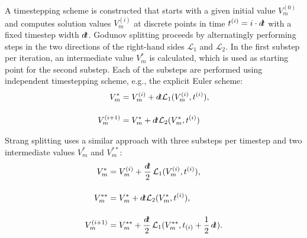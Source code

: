 A timestepping scheme is constructed that starts with a given initial value $V_m^{(0)}$ and computes solution values $V_m^{(i)}$ at discrete points in time $t^{(i)} = i\cdot\dt$ with a fixed timestep width $\dt$.
Godunov splitting proceeds by alternatingly performing steps in the two directions of the right-hand sides $\mathcal{L}_1$ and $\mathcal{L}_2$. In the first substep per iteration, an intermediate value $V_m^{\ast}$ is calculated, which is used as starting point for the second substep. Each of the substeps are performed using independent timestepping scheme, e.g., the explicit Euler scheme:
%
\begin{subequations}\label{eq:monodomain_godunov}
  \begin{align}
    V_m^{\ast} &= V_m^{(i)} + \dt \mathcal{L}_1(V_m^{(i)},t^{(i)}),\\[4mm]
    V_m^{(i+1)} &= V_m^{\ast} + \dt \mathcal{L}_2(V_m^{\ast},t^{(i)})
  \end{align}
\end{subequations}

Strang splitting uses a similar approach with three substeps per timestep and two intermediate values $V_m^{\ast}$ and $V_m^{\ast\ast}$:
%
\begin{subequations}\label{eq:monodomain_strang}
  \begin{align}
    V_m^{\ast} &= V_m^{(i)} + \dfrac{\dt}{2} \mathcal{L}_1(V_m^{(i)},t^{(i)}),\\[4mm]
    V_m^{\ast\ast} &= V_m^{\ast} + \dt \mathcal{L}_2(V_m^{\ast},t^{(i)}),\\[4mm]
    V_m^{(i+1)} &= V_m^{\ast\ast} + \dfrac{\dt}{2} \mathcal{L}_1(V_m^{\ast\ast},t_{(i)}+\dfrac12 \dt).
  \end{align}
\end{subequations}
%

